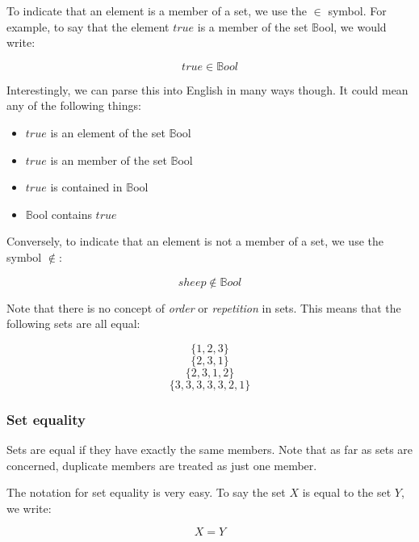 To indicate that an element is a member of a set, we use the $\in$ symbol. For
example, to say that the element $true$ is a member of the set $\mathbb{B}$ool,
we would write:

\begin{dmath}
	true \in \mathbb{B}ool
\end{dmath}

Interestingly, we can parse this into English in many ways though. It could mean
any of the following things:

\begin{itemize}
	\item $true$ is an element of the set $\mathbb{B}$ool
	\item $true$ is an member of the set $\mathbb{B}$ool
	\item $true$ is contained in $\mathbb{B}$ool
	\item $\mathbb{B}$ool contains $true$
\end{itemize}

Conversely, to indicate that an element is not a member of a set, we use the
symbol $\notin$:

\begin{dmath}
	sheep \not\in \mathbb{B}ool
\end{dmath}

Note that there is no concept of {\it order} or {\it repetition} in sets. This
means that the following sets are all equal:

\begin{dmath}
	\{1,2,3\}
\end{dmath}
\begin{dmath}
	\{2,3,1\}
\end{dmath}
\begin{dmath}
	\{2,3,1,2\}
\end{dmath}
\begin{dmath}
	\{3,3,3,3,3,2,1\}
\end{dmath}

\subsubsection{Set equality}

Sets are equal if they have exactly the same members. Note that as far as sets
are concerned, duplicate members are treated as just one member.

The notation for set equality is very easy. To say the set $X$ is equal to the
set $Y$, we write:

\begin{dmath}
	X = Y
\end{dmath}

